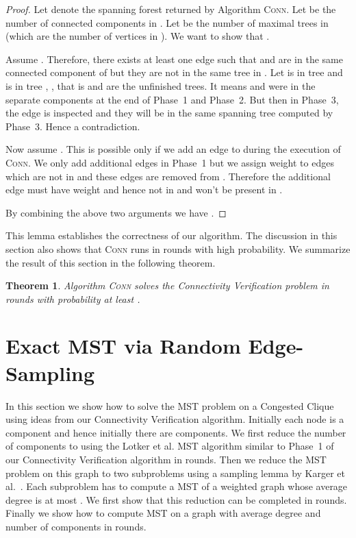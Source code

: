 \documentclass[11pt]{article}
\newtheorem{theorem}{Theorem}
\begin{document}
\begin{proof}
  Let  denote the spanning forest returned by Algorithm \textsc{Conn}. 
  Let  be the number of connected components in . 
  Let  be the number of maximal trees in  (which are the number of vertices in ). 
  We want to show that . 

  Assume .
  Therefore, there exists at least one edge  such that  and  are in the same connected component of  but they are not in the same tree in . 
  Let  is in tree  and  is in tree , , that is  and  are the unfinished trees.
  It means  and  were in the separate components at the end of Phase~1 and Phase~2. 
  But then in Phase~3, the edge  is inspected and they will be in the same spanning tree computed by Phase~3. 
  Hence a contradiction.

  Now assume . 
  This is possible only if we add an edge  to  during the execution of \textsc{Conn}. 
  We only add additional edges in Phase~1 but we assign weight  to edges which are not in  and these edges are removed from .  
  Therefore the additional edge must have weight  and hence not in  and won't be present in . 
  
  \noindent By combining the above two arguments we have .
\end{proof}
\noindent This lemma establishes the correctness of our algorithm. 
The discussion in this section also shows that \textsc{Conn} runs in  rounds with high probability. 
We summarize the result of this section in the following theorem. 

\begin{theorem}
  Algorithm \textsc{Conn} solves the Connectivity Verification problem in  rounds with probability at least . 
\end{theorem}

\section{Exact MST via Random Edge-Sampling} \label{sec:mst}
In this section we show how to solve the MST problem on a Congested Clique using ideas from our Connectivity Verification algorithm.
Initially each node is a component and hence initially there are  components. 
We first reduce the number of components to  using the Lotker et al. MST algorithm similar to Phase~1 of our Connectivity Verification algorithm in  rounds. 
Then we reduce the MST problem on this graph to two subproblems using a sampling lemma by Karger et al.~\cite{KKT1995MST}.
Each subproblem has to compute a MST of a weighted graph whose average degree is at most . 
We first show that this reduction can be completed in  rounds. 
Finally we show how to compute MST on a graph with average degree  and number of components  in  rounds.
\end{document}
